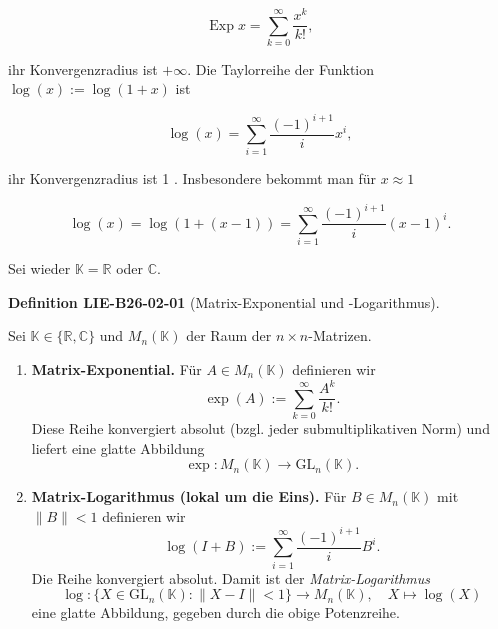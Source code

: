 \documentclass[10pt, letterpaper]{article}
\newcommand{\CustomHeading}[3]{%
  \par\medskip\noindent%
  \textbf{#1 #2} \textnormal{(#3)}.\enskip%
}
\newenvironment{DEF}[2]{\begin{unitbox}\CustomHeading{Definition}{#1}{#2}}{\end{unitbox}}
\begin{document}
$$
\operatorname{Exp} x=\sum_{k=0}^{\infty} \frac{x^{k}}{k!},
$$

ihr Konvergenzradius ist $+\infty$. Die Taylorreihe der Funktion $\log (x):= \log (1+x)$ ist

$$
\log (x)=\sum_{i=1}^{\infty} \frac{(-1)^{i+1}}{i} x^{i},
$$

ihr Konvergenzradius ist 1 . Insbesondere bekommt man für $x \approx 1$

$$
\log (x)=\log (1+(x-1))=\sum_{i=1}^{\infty} \frac{(-1)^{i+1}}{i}(x-1)^{i} .
$$

Sei wieder $\mathbb{K}=\mathbb{R}$ oder $\mathbb{C}$.




\begin{DEF}{LIE-B26-02-01}{Matrix-Exponential und -Logarithmus}
Sei $\mathbb{K} \in \{\mathbb{R}, \mathbb{C}\}$ und $M_n(\mathbb{K})$ der Raum der $n \times n$-Matrizen.
\begin{enumerate}
\item \textbf{Matrix-Exponential.} Für $A \in M_n(\mathbb{K})$ definieren wir
\[
\exp(A) := \sum_{k=0}^{\infty} \frac{A^k}{k!}.
\]
Diese Reihe konvergiert absolut (bzgl. jeder submultiplikativen Norm) und liefert eine glatte Abbildung
\[
\exp : M_n(\mathbb{K}) \to \mathrm{GL}_n(\mathbb{K}).
\]

\item \textbf{Matrix-Logarithmus (lokal um die Eins).}  
Für $B \in M_n(\mathbb{K})$ mit $\|B\| < 1$ definieren wir
\[
\log(I + B) := \sum_{i=1}^{\infty} \frac{(-1)^{i+1}}{i} B^i.
\]
Die Reihe konvergiert absolut. Damit ist der \emph{Matrix-Logarithmus}
\[
\log : \{ X \in \mathrm{GL}_n(\mathbb{K}) : \|X - I\| < 1 \} \to M_n(\mathbb{K}),
\quad X \mapsto \log(X)
\]
eine glatte Abbildung, gegeben durch die obige Potenzreihe.
\end{enumerate}
\end{DEF}
\end{document}
